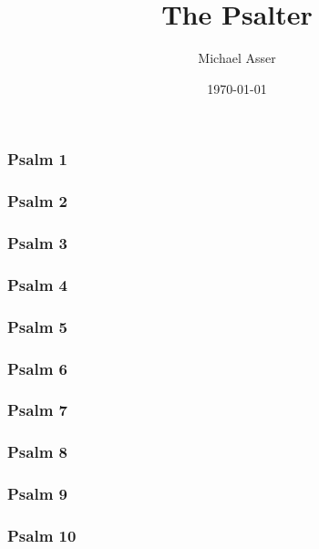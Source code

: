 \documentclass[10pt]{extarticle}
\title{The Psalter}
\author{Michael Asser}
\date{\today}
\begin{document}
\begin{multicols}{2}

\subsubsection{Psalm 1}

\newpage

\subsubsection{Psalm 2}

\newpage

\subsubsection{Psalm 3}

\newpage

\subsubsection{Psalm 4}

\newpage

\subsubsection{Psalm 5}

\newpage

\subsubsection{Psalm 6}

\newpage

\subsubsection{Psalm 7}

\newpage

\subsubsection{Psalm 8}

\newpage

\subsubsection{Psalm 9}

\newpage

\subsubsection{Psalm 10}

\newpage


\end{multicols}
\end{document}

